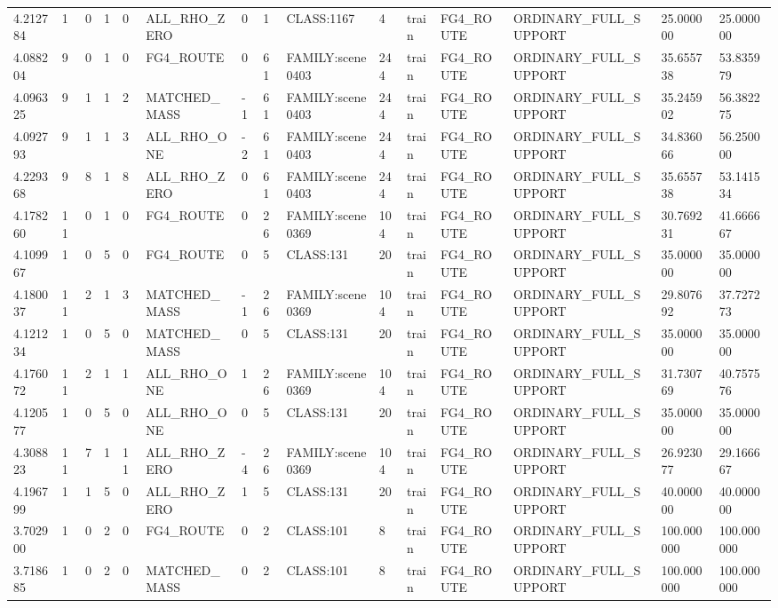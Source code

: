 \begin{tabular}{lllllllllllllll}
4.212784 & 1 & 0 & 1 & 0 & ALL\_RHO\_ZERO & 0 & 1 & CLASS:1167 & 4 & train & FG4\_ROUTE & ORDINARY\_FULL\_SUPPORT & 25.000000 & 25.000000 \\
4.088204 & 9 & 0 & 1 & 0 & FG4\_ROUTE & 0 & 61 & FAMILY:scene0403 & 244 & train & FG4\_ROUTE & ORDINARY\_FULL\_SUPPORT & 35.655738 & 53.835979 \\
4.096325 & 9 & 1 & 1 & 2 & MATCHED\_MASS & -1 & 61 & FAMILY:scene0403 & 244 & train & FG4\_ROUTE & ORDINARY\_FULL\_SUPPORT & 35.245902 & 56.382275 \\
4.092793 & 9 & 1 & 1 & 3 & ALL\_RHO\_ONE & -2 & 61 & FAMILY:scene0403 & 244 & train & FG4\_ROUTE & ORDINARY\_FULL\_SUPPORT & 34.836066 & 56.250000 \\
4.229368 & 9 & 8 & 1 & 8 & ALL\_RHO\_ZERO & 0 & 61 & FAMILY:scene0403 & 244 & train & FG4\_ROUTE & ORDINARY\_FULL\_SUPPORT & 35.655738 & 53.141534 \\
4.178260 & 11 & 0 & 1 & 0 & FG4\_ROUTE & 0 & 26 & FAMILY:scene0369 & 104 & train & FG4\_ROUTE & ORDINARY\_FULL\_SUPPORT & 30.769231 & 41.666667 \\
4.109967 & 1 & 0 & 5 & 0 & FG4\_ROUTE & 0 & 5 & CLASS:131 & 20 & train & FG4\_ROUTE & ORDINARY\_FULL\_SUPPORT & 35.000000 & 35.000000 \\
4.180037 & 11 & 2 & 1 & 3 & MATCHED\_MASS & -1 & 26 & FAMILY:scene0369 & 104 & train & FG4\_ROUTE & ORDINARY\_FULL\_SUPPORT & 29.807692 & 37.727273 \\
4.121234 & 1 & 0 & 5 & 0 & MATCHED\_MASS & 0 & 5 & CLASS:131 & 20 & train & FG4\_ROUTE & ORDINARY\_FULL\_SUPPORT & 35.000000 & 35.000000 \\
4.176072 & 11 & 2 & 1 & 1 & ALL\_RHO\_ONE & 1 & 26 & FAMILY:scene0369 & 104 & train & FG4\_ROUTE & ORDINARY\_FULL\_SUPPORT & 31.730769 & 40.757576 \\
4.120577 & 1 & 0 & 5 & 0 & ALL\_RHO\_ONE & 0 & 5 & CLASS:131 & 20 & train & FG4\_ROUTE & ORDINARY\_FULL\_SUPPORT & 35.000000 & 35.000000 \\
4.308823 & 11 & 7 & 1 & 11 & ALL\_RHO\_ZERO & -4 & 26 & FAMILY:scene0369 & 104 & train & FG4\_ROUTE & ORDINARY\_FULL\_SUPPORT & 26.923077 & 29.166667 \\
4.196799 & 1 & 1 & 5 & 0 & ALL\_RHO\_ZERO & 1 & 5 & CLASS:131 & 20 & train & FG4\_ROUTE & ORDINARY\_FULL\_SUPPORT & 40.000000 & 40.000000 \\
3.702900 & 1 & 0 & 2 & 0 & FG4\_ROUTE & 0 & 2 & CLASS:101 & 8 & train & FG4\_ROUTE & ORDINARY\_FULL\_SUPPORT & 100.000000 & 100.000000 \\
3.718685 & 1 & 0 & 2 & 0 & MATCHED\_MASS & 0 & 2 & CLASS:101 & 8 & train & FG4\_ROUTE & ORDINARY\_FULL\_SUPPORT & 100.000000 & 100.000000 \\

\end{tabular}
